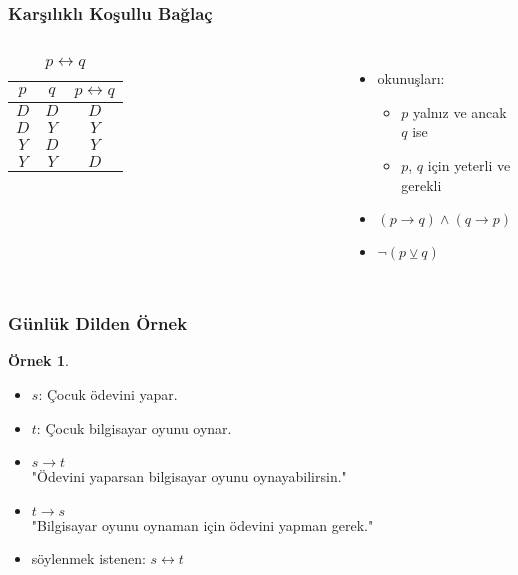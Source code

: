\documentclass[dvipsnames]{beamer}
\theoremstyle{definition}
\theoremstyle{example}
\newtheorem{ornek}[theorem]{Örnek}
\theoremstyle{plain}
\begin{document}
\begin{frame}
  \frametitle{Karşılıklı Koşullu Bağlaç}

  \begin{columns}
    \begin{table}
      \caption{$p \leftrightarrow q$}
      \begin{tabular}{|c|c||c|}\hline
        $p$ & $q$ & $p \leftrightarrow q$\\\hline\hline
        $D$ & $D$ & $D$                  \\\hline
        $D$ & $Y$ & $Y$                  \\\hline
        $Y$ & $D$ & $Y$                  \\\hline
        $Y$ & $Y$ & $D$                  \\\hline
      \end{tabular}
    \end{table}

    \pause
    \begin{itemize}
      \item okunuşları:
      \begin{itemize}
        \item $p$ yalnız ve ancak $q$ ise
        \item $p$, $q$ için yeterli ve gerekli
      \end{itemize}

      \pause
      \item $(p \rightarrow q) \wedge (q \rightarrow p)$
      \item $\neg (p \veebar q)$
    \end{itemize}
  \end{columns}
\end{frame}

\begin{frame}
  \frametitle{Günlük Dilden Örnek}

  \begin{ornek}
    \begin{itemize}
      \item $s$: Çocuk ödevini yapar.
      \item $t$: Çocuk bilgisayar oyunu oynar.

      \pause
      \medskip
      \item $s \rightarrow t$\\
        "Ödevini yaparsan bilgisayar oyunu oynayabilirsin."
      \item $t \rightarrow s$\\
        "Bilgisayar oyunu oynaman için ödevini yapman gerek."

      \pause
      \medskip
      \item söylenmek istenen: $s \leftrightarrow t$
    \end{itemize}
  \end{ornek}
\end{frame}
\end{document}
